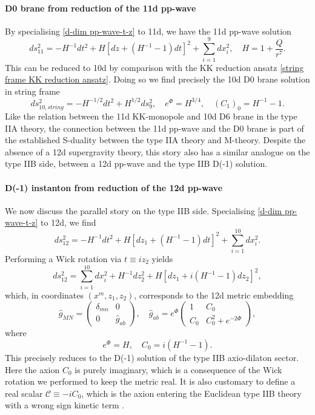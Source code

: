 \paragraph{D0 brane from reduction of the 11d pp-wave}
By specialising \eqref{d-dim pp-wave-t-z} to 11d, we have the 11d pp-wave solution
\begin{equation}
ds_{11}^2
=
-H^{-1}dt^2+H[dz+(H^{-1}-1)dt]^2
+\sum_{i=1}^9 dx_i^2,\quad
H=1+\frac{Q}{r^7}.
\end{equation}
This can be reduced to 10d by comparison with the KK reduction ansatz \eqref{string frame KK reduction ansatz}.
Doing so we find precisely the 10d D0 brane solution in string frame \cite{Stelle:1998xg}
\begin{equation}
ds_{10,string}^2
=-H^{-1/2} dt^2+H^{1/2}ds_9^2,\quad
e^{\Phi} = H^{3/4},\quad
(C_1)_0 = H^{-1}-1.
\end{equation}
Like the relation between the 11d KK-monopole and 10d D6 brane in the type IIA theory, the connection between the 11d pp-wave and the D0 brane is part of the established S-duality between the type IIA theory and M-theory. Despite the absence of a 12d supergravity theory, this story also has a similar analogue on the type IIB side, between a 12d pp-wave and the type IIB D(-1) solution.


\paragraph{D(-1) instanton from reduction of the 12d pp-wave}
We now discuss the parallel story on the type IIB side. 
Specialising \eqref{d-dim pp-wave-t-z} to 12d, we find
\begin{equation}
ds_{12}^2 = - H^{-1}dt^2 + H[dz_1 + (H^{-1}-1)dt]^2 + \sum_{i=1}^{10} dx_i^2.
\end{equation}
Performing a Wick rotation via $t \equiv iz_2$ yields
\begin{equation}
ds_{12}^2
= \sum_{i=1}^{10} dx_i^2 + H^{-1}dz_2^2 + H[dz_1 + i(H^{-1}-1)dz_2]^2,
\end{equation}
which, in coordinates $(x^m, z_1, z_2)$, corresponds to the 12d metric embedding
\begin{equation}
\widehat{g}_{MN} = 
\begin{pmatrix}
\delta_{mn} & 0 \\
0 & \widehat{g}_{ab}
\end{pmatrix},\quad
\widehat{g}_{ab} =
e^{\Phi}\begin{pmatrix}
1 & C_0 \\
C_0 & C_0^2 + e^{-2\Phi}
\end{pmatrix},
\end{equation}
where
\begin{equation}
e^\Phi = H, \quad
C_0 = i (H^{-1}-1).
\end{equation}
This precisely reduces to the D(-1) solution of the type IIB axio-dilaton sector.
Here the axion $C_0$ is purely imaginary, which is a consequence of the Wick rotation we performed to keep the metric real.
It is also customary to define a real scalar $\mathcal C \equiv -i C_0$, which is the axion entering the Euclidean type IIB theory with a wrong sign kinetic term \cite{Gibbons:1995vg}.


